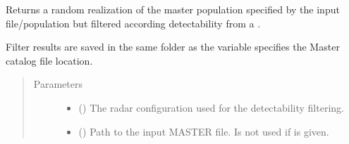 \documentclass[letterpaper,10pt,english]{sphinxmanual}
\begin{document}
\begin{fulllineitems}
\label{\detokenize{modules/population_library:population_library.NESCv9_mini_moons}}
\end{fulllineitems}


\begin{fulllineitems}
\label{\detokenize{modules/population_library:population_library.filtered_master_catalog_factor}}
Returns a random realization of the master population specified by the input file/population but filtered according detectability from a {\hyperref[\detokenize{modules/radar_config:radar_config.RadarSystem}]{}}.

Filter results are saved in the same folder as the  variable specifies the Master catalog file location.
\begin{quote}\begin{description}
\item[{Parameters}] \leavevmode\begin{itemize}
\item {} 
 ({\hyperref[\detokenize{modules/radar_config:radar_config.RadarSystem}]{}}) \textendash{} The radar configuration used for the detectability filtering.

\item {} 
 () \textendash{} Path to the input MASTER file. Is not used if  is given.


\end{itemize}
\end{description}
\end{quote}
\end{fulllineitems}
\end{document}
